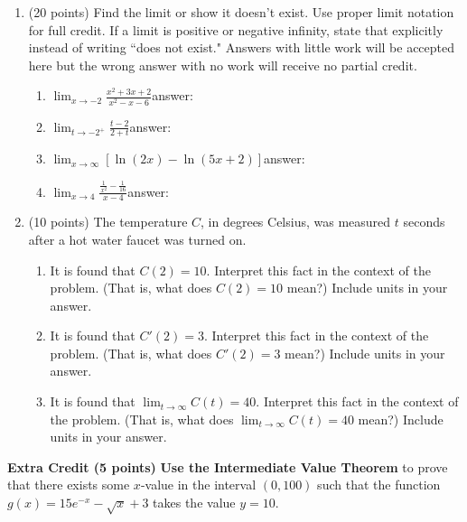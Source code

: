 \documentclass[11pt]{article}
\renewcommand{\d}{\displaystyle}
\begin{document}
\begin{enumerate}
\newpage
\item (20 points) Find the limit or show it doesn't exist. Use proper limit notation for full credit. If a limit is positive or negative infinity, state that explicitly instead of writing ``does not exist." Answers with little work will be accepted here but the wrong answer with no work will receive no partial credit.

\begin{enumerate}
	\item $\d \lim_{x\to -2}\frac{x^2+3x+2}{x^2-x-6}$\hfill answer: \ans\ans %
	\vfill
	\item $\d \lim_{t\to-2^+} \frac{t - 2}{2 + t}$\hfill answer: \ans\ans%
	\vfill
		\item $\d \lim_{x\to\infty}\left[\ln{(2x)} - \ln(5x + 2)\right]$\hfill answer: \ans\ans %
	\vfill
	\item $\d \lim_{x\to4}\frac{\frac{1}{x^2} - \frac{1}{16}}{x - 4}$\hfill answer: \ans\ans %
	\vfill

\end{enumerate}

\newpage
\item (10 points) The temperature $C$, in degrees Celsius, was measured $t$ seconds after a hot water faucet was turned on.
	\begin{enumerate}
	\item It is found that $C(2)=10.$ Interpret this fact in the context of the problem. (That is, what does $C(2)=10$ mean?)  Include units in your answer.
	\vspace{1in}	
	\item It is found that $C'(2)=3.$ Interpret this fact in the context of the problem. (That is, what does $C'(2)=3$ mean?) Include units in your answer.
	\vspace{1in}
	\item It is found that $\displaystyle{\lim_{t \to \infty} C(t)=40}.$ Interpret this fact in the context of the problem. (That is, what does $\displaystyle{\lim_{t \to \infty} C(t)=40}$ mean?)  Include units in your answer.
	\vspace{1in}
	\end{enumerate}


\end{enumerate}


\textbf{Extra Credit (5 points)} \textbf{Use the Intermediate Value Theorem} to prove that there exists some $x$-value in the interval $(0,100)$ such that the function $g(x)=15e^{-x}-\sqrt{x}+3$ takes the value $y=10.$
\vfill
\end{document}
